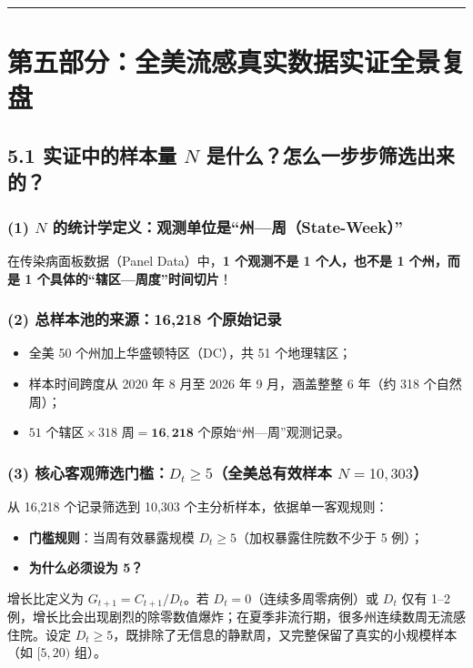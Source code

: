 \documentclass[11pt,a4paper]{ctexart}
\begin{document}
\vspace{0.8em}\hrule\vspace{0.8em}

\section{第五部分：全美流感真实数据实证全景复盘}

\subsection{5.1 实证中的样本量 $N$ 是什么？怎么一步步筛选出来的？}

\subsubsection{(1) $N$ 的统计学定义：观测单位是“州—周（State-Week）”}
在传染病面板数据（Panel Data）中，\textbf{1 个观测不是 1 个人，也不是 1 个州，而是 1 个具体的“辖区—周度”时间切片}！


\subsubsection{(2) 总样本池的来源：16,218 个原始记录}
\begin{itemize}[leftmargin=2em, itemsep=2pt, parsep=0pt]
\item 全美 50 个州加上华盛顿特区（DC），共 51 个地理辖区；
\item 样本时间跨度从 2020 年 8 月至 2026 年 9 月，涵盖整整 6 年（约 318 个自然周）；
\item $51 \text{ 个辖区} \times 318 \text{ 周} = \mathbf{16,218}$ 个原始“州—周”观测记录。
\end{itemize}

\subsubsection{(3) 核心客观筛选门槛：$D_t \ge 5$（全美总有效样本 $N = 10,303$）}
从 16,218 个记录筛选到 10,303 个主分析样本，依据单一客观规则：

\begin{itemize}[leftmargin=2em, itemsep=2pt, parsep=0pt]
\item \textbf{门槛规则}：当周有效暴露规模 $D_t \ge 5$（加权暴露住院数不少于 5 例）；
\item \textbf{为什么必须设为 5？}
\end{itemize}
增长比定义为 $G_{t+1} = C_{t+1}/D_t$。若 $D_t = 0$（连续多周零病例）或 $D_t$ 仅有 1–2 例，增长比会出现剧烈的除零数值爆炸；在夏季非流行期，很多州连续数周无流感住院。设定 $D_t \ge 5$，既排除了无信息的静默周，又完整保留了真实的小规模样本（如 $[5, 20)$ 组）。
\end{document}
